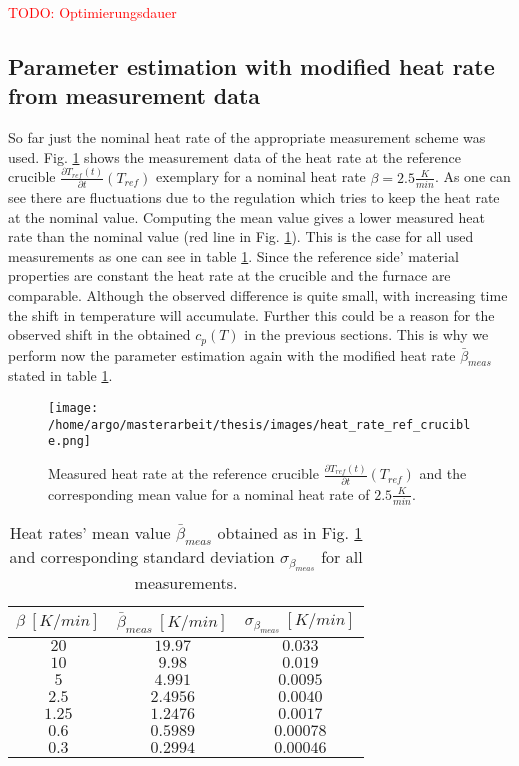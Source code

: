 \documentclass{scrartcl}[12pt, halfparskip]
\numberwithin{equation}{section}
\numberwithin{figure}{section}
\numberwithin{table}{section}
\newcommand{\todo}[1]{\textcolor{red}{TODO: #1}}
\begin{document}
\todo{Optimierungsdauer}


\subsection{Parameter estimation with modified heat rate from measurement data}
So far just the nominal heat rate of the appropriate measurement scheme was used. 
Fig. \ref{fig:heat_rate_measurement} shows the measurement data of the heat rate at the reference crucible $\frac{\partial T_{ref}(t)}{\partial t}(T_{ref})$ exemplary for a nominal heat rate $\beta = 2.5 \frac{K}{min}$. 
As one can see there are fluctuations due to the regulation which tries to keep the heat rate at the nominal value. 
Computing the mean value gives a lower measured heat rate than the nominal value (red line in Fig. \ref{fig:heat_rate_measurement}). 
This is the case for all used measurements as one can see in table \ref{tab:mod_heat_rate}. 
Since the reference side' material properties are constant the heat rate at the crucible and the furnace are comparable.
Although the observed difference is quite small, with increasing time the shift in temperature will accumulate.
Further this could be a reason for the observed shift in the obtained $c_p(T)$ in the previous sections.
This is why we perform now the parameter estimation again with the modified heat rate $\bar{\beta}_{meas}$ stated in table \ref{tab:mod_heat_rate}.


\begin{figure}[H]
	\centering
	\texttt{[image: /home/argo/masterarbeit/thesis/images/heat\_rate\_ref\_crucible.png]}
	\caption{Measured heat rate at the reference crucible $\frac{\partial T_{ref}(t)}{\partial t}(T_{ref})$ and the corresponding mean value for a nominal heat rate of $2.5 \frac{K}{min}$.}
	\label{fig:heat_rate_measurement}
\end{figure}

\begin{table}[H]
	\centering
	\begin{tabular}{| c | c | c |} \hline 
		$\beta \ [K/min]$ & $\bar{\beta}_{meas} \ [K/min]$ & $\sigma_{\beta_{meas}} \ [K/min]$ \\ \hline
		$20$ & $19.97$ & $0.033$ \\
		$10$ & $9.98$ & $0.019$ \\
		$5$ & $4.991$ & $0.0095$ \\
		$2.5$ & $2.4956$ & $0.0040$ \\
		$1.25$ & $1.2476$ & $0.0017$ \\
		$0.6$ & $0.5989$ & $0.00078$ \\
		$0.3$ & $0.2994$ & $0.00046$ \\ \hline
	\end{tabular}
	\caption{Heat rates' mean value $\bar{\beta}_{meas}$ obtained as in Fig. \ref{fig:heat_rate_measurement} and corresponding standard deviation $\sigma_{\beta_{meas}}$ for all measurements.}
	\label{tab:mod_heat_rate}
\end{table}
\end{document}
